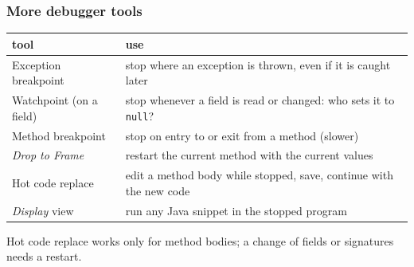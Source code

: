 \documentclass[aspectratio=169,10pt,compress]{beamer}
\begin{document}
\begin{frame}[t,fragile] \frametitle{More debugger tools}
  \begin{center}\small
  \begin{tabular}{L{0.3\textwidth}L{0.62\textwidth}}
    \toprule
    \textbf{tool}                       & \textbf{use} \\
    \midrule
    Exception breakpoint                & stop where an exception is thrown, even if it is caught later \\
    Watchpoint (on a field)             & stop whenever a field is read or changed: who sets it to \texttt{null}? \\
    Method breakpoint                   & stop on entry to or exit from a method (slower) \\
    \emph{Drop to Frame}                & restart the current method with the current values \\
    Hot code replace                    & edit a method body while stopped, save, continue with the new code \\
    \emph{Display} view                 & run any Java snippet in the stopped program \\
    \bottomrule
  \end{tabular}
  \end{center}
  \small Hot code replace works only for method bodies; a change of fields or signatures needs a restart.
\end{frame}

\end{document}

